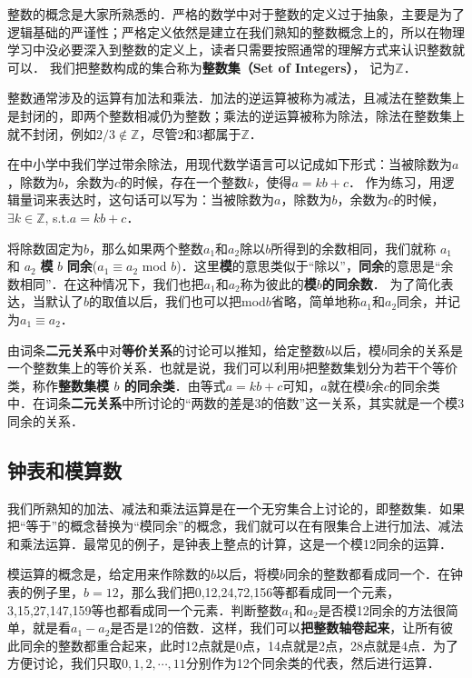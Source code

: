 
整数的概念是大家所熟悉的．严格的数学中对于整数的定义过于抽象，主要是为了逻辑基础的严谨性；严格定义依然是建立在我们熟知的整数概念上的，所以在物理学习中没必要深入到整数的定义上，读者只需要按照通常的理解方式来认识整数就可以． 我们把整数构成的集合称为\textbf{整数集（Set of Integers）}， 记为$\mathbb{Z}$．

整数通常涉及的运算有加法和乘法．加法的逆运算被称为减法，且减法在整数集上是封闭的，即两个整数相减仍为整数；乘法的逆运算被称为除法，除法在整数集上就不封闭，例如$2/3\not\in\mathbb{Z}$，尽管$2$和$3$都属于$\mathbb{Z}$．

在中小学中我们学过带余除法，用现代数学语言可以记成如下形式：当被除数为$a$，除数为$b$，余数为$c$的时候，存在一个整数$k$，使得$a=kb+c$． 作为练习，用逻辑量词来表达时，这句话可以写为：当被除数为$a$，除数为$b$，余数为$c$的时候，$\exists k\in \mathbb{Z}$, s.t.$ a=kb+c$． 

将除数固定为$b$，那么如果两个整数$a_1$和$a_2$除以$b$所得到的余数相同，我们就称 $a_1$ 和 $a_2$ \textbf{模} $b$ \textbf{同余}($a_1\equiv a_2$ mod $b$)．这里\textbf{模}的意思类似于“除以”，\textbf{同余}的意思是“余数相同”．在这种情况下，我们也把$a_1$和$a_2$称为彼此的\textbf{模}$b$\textbf{的同余数}． 为了简化表达，当默认了$b$的取值以后，我们也可以把mod$b$省略，简单地称$a_1$和$a_2$同余，并记为$a_1\equiv a_2$． 

由词条\textbf{二元关系}中对\textbf{等价关系}的讨论可以推知，给定整数$b$以后，模$b$同余的关系是一个整数集上的等价关系．也就是说，我们可以利用$b$把整数集划分为若干个等价类，称作\textbf{整数集模 $b$ 的同余类}．由等式$a=kb+c$可知，$a$就在模$b$余$c$的同余类中．在词条\textbf{二元关系}中所讨论的“两数的差是3的倍数”这一关系，其实就是一个模3同余的关系．

\subsection{钟表和模算数}

我们所熟知的加法、减法和乘法运算是在一个无穷集合上讨论的，即整数集．如果把“等于”的概念替换为“模同余”的概念，我们就可以在有限集合上进行加法、减法和乘法运算．最常见的例子，是钟表上整点的计算，这是一个模12同余的运算．

模运算的概念是，给定用来作除数的$b$以后，将模$b$同余的整数都看成同一个．在钟表的例子里，$b=12$，那么我们把0,12,24,72,156等都看成同一个元素，3,15,27,147,159等也都看成同一个元素．判断整数$a_1$和$a_2$是否模12同余的方法很简单，就是看$a_1-a_2$是否是12的倍数．这样，我们可以\textbf{把整数轴卷起来}，让所有彼此同余的整数都重合起来，此时12点就是0点，14点就是2点，28点就是4点．为了方便讨论，我们只取$0,1,2,\cdots,11$分别作为12个同余类的代表，然后进行运算．

